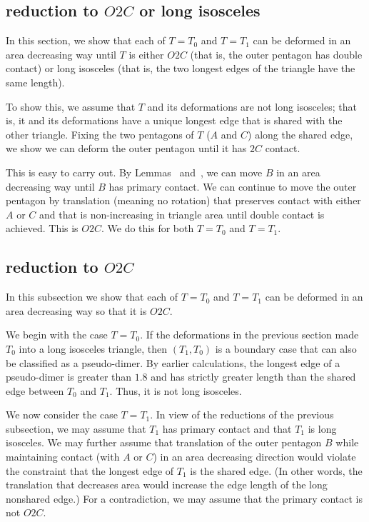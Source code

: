 \subsection{reduction to $O2C$ or long isosceles}

In this section, we show that each of $T=T_0$ and $T=T_1$ can be
deformed in an area decreasing way until $T$ is either $O2C$ (that is,
the outer pentagon has double contact) or long isosceles (that is, the
two longest edges of the triangle have the same length).

To show this, we assume that $T$ and its deformations are not long
isosceles; that is, it and its deformations have a unique longest edge
that is shared with the other triangle.  Fixing the two pentagons of
$T$ ($A$ and $C$) along the shared edge, we show we can deform the
outer pentagon until it has $2C$ contact.

This is easy to carry out.  By Lemmas~
and~, we can move $B$ in an area decreasing way
until $B$ has primary contact.  We can continue to move the outer
pentagon by translation (meaning no rotation) that preserves contact
with either $A$ or $C$ and that is non-increasing in triangle area
until double contact is achieved.  This is $O2C$.  We do this for both
$T=T_0$ and $T=T_1$.

\subsection{reduction to $O2C$}

In this subsection we show that each of $T=T_0$ and $T=T_1$ can be
deformed in an area decreasing way so that it is $O2C$.

We begin with the case $T=T_0$.  If the deformations in the previous
section made $T_0$ into a long isosceles triangle, then $(T_1,T_0)$ is
a boundary case that can also be classified as a pseudo-dimer.  By
earlier calculations, the longest edge of a pseudo-dimer is greater
than $1.8$ and has strictly greater length than the shared edge
between $T_0$ and $T_1$.  Thus, it is not long isosceles.

We now consider the case $T=T_1$.  In view of the reductions of the
previous subsection, we may assume that $T_1$ has primary contact and
that $T_1$ is long isosceles.  We may further assume that translation
of the outer pentagon $B$ while maintaining contact (with  $A$ or $C$)
in an area decreasing direction would violate the constraint that the
longest edge of $T_1$ is the shared edge.  (In other words, the
translation that decreases area would increase the edge length of the
long nonshared edge.)  For a contradiction, we may assume that the
primary contact is not $O2C$.

